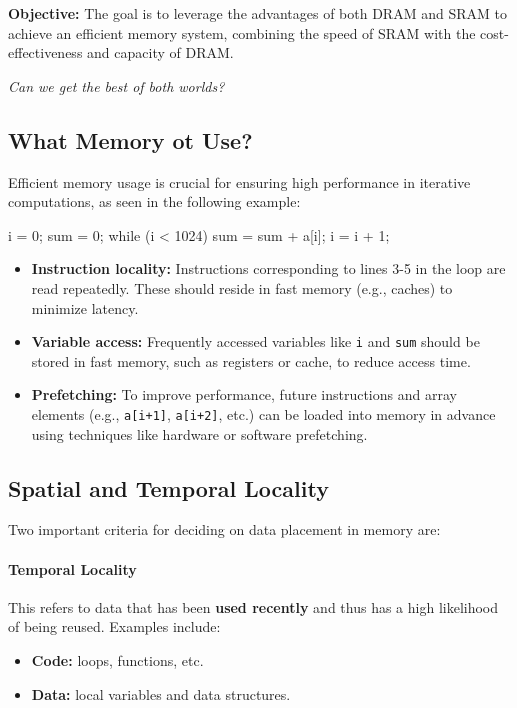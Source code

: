 \textbf{Objective:} The goal is to leverage the advantages of both DRAM and SRAM to achieve an efficient memory system, combining the speed of SRAM with the cost-effectiveness and capacity of DRAM.

\begin{center}
    \textit{Can we get the best of both worlds?}
\end{center}


\subsection{What Memory ot Use?}
Efficient memory usage is crucial for ensuring high performance in iterative computations, as seen in the following example:
\begin{cc}
i = 0;
sum = 0;
while (i < 1024) {
    sum = sum + a[i];
    i = i + 1;
}
\end{cc}
\begin{itemize}
    \item \textbf{Instruction locality:} Instructions corresponding to lines 3-5 in the loop are read repeatedly. These should reside in fast memory (e.g., caches) to minimize latency.
    \item \textbf{Variable access:} Frequently accessed variables like \texttt{i} and \texttt{sum} should be stored in fast memory, such as registers or cache, to reduce access time.
    \item \textbf{Prefetching:} To improve performance, future instructions and array elements (e.g., \texttt{a[i+1]}, \texttt{a[i+2]}, etc.) can be loaded into memory in advance using techniques like hardware or software prefetching.
\end{itemize}

\subsection{Spatial and Temporal Locality}
Two important criteria for deciding on data placement in memory are:

\paragraph{Temporal Locality} This refers to data that has been \textbf{used recently} and thus has a high likelihood of being reused. Examples include:
\begin{itemize}
    \item \textbf{Code:} loops, functions, etc.
    \item \textbf{Data:} local variables and data structures.
\end{itemize}

